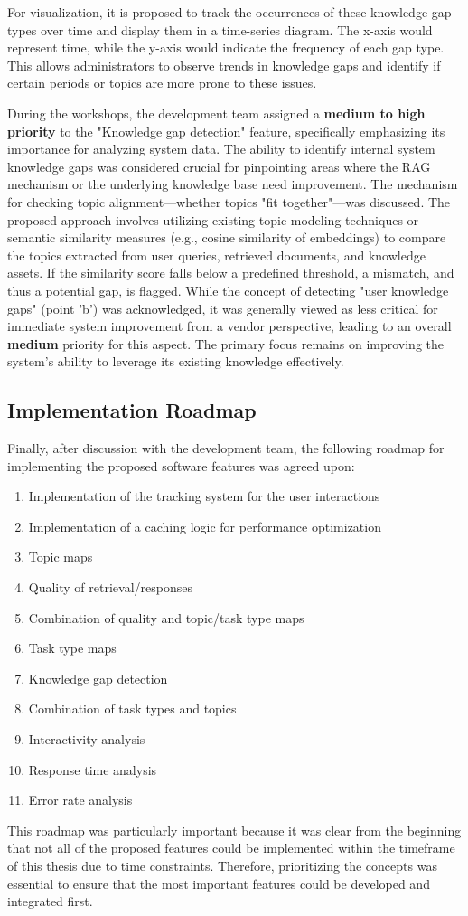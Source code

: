 \documentclass[
	english,
	ruledheaders=section,%
	class=report,%
	thesis={type=bachelor},%
	accentcolor=1b,%
	custommargins=true,%
	marginpar=false,%
	parskip=half-,%
	fontsize=11pt,%
	DIV=14,
]{tudapub}
\begin{document}
For visualization, it is proposed to track the occurrences of these knowledge gap types over time and display them in a time-series diagram. The x-axis would represent time, while the y-axis would indicate the frequency of each gap type. This allows administrators to observe trends in knowledge gaps and identify if certain periods or topics are more prone to these issues.

During the workshops, the development team assigned a \textbf{medium to high priority} to the "Knowledge gap detection" feature, specifically emphasizing its importance for analyzing system data. The ability to identify internal system knowledge gaps was considered crucial for pinpointing areas where the RAG mechanism or the underlying knowledge base need improvement. The mechanism for checking topic alignment---whether topics "fit together"---was discussed. The proposed approach involves utilizing existing topic modeling techniques or semantic similarity measures (e.g., cosine similarity of embeddings) to compare the topics extracted from user queries, retrieved documents, and knowledge assets. If the similarity score falls below a predefined threshold, a mismatch, and thus a potential gap, is flagged. While the concept of detecting "user knowledge gaps" (point 'b') was acknowledged, it was generally viewed as less critical for immediate system improvement from a vendor perspective, leading to an overall \textbf{medium} priority for this aspect. The primary focus remains on improving the system's ability to leverage its existing knowledge effectively.
\subsection{Implementation Roadmap}
Finally, after discussion with the development team, the following roadmap for implementing the proposed software features was agreed upon:
\begin{enumerate}
    \item Implementation of the tracking system for the user interactions
    \item Implementation of a caching logic for performance optimization
    \item Topic maps
    \item Quality of retrieval/responses
    \item Combination of quality and topic/task type maps
    \item Task type maps
    \item Knowledge gap detection
    \item Combination of task types and topics
    \item Interactivity analysis
    \item Response time analysis
    \item Error rate analysis
\end{enumerate}
This roadmap was particularly important because it was clear from the beginning that not all of the proposed features could be implemented within the timeframe of this thesis due to time constraints. Therefore, prioritizing the concepts was essential to ensure that the most important features could be developed and integrated first.
\end{document}
